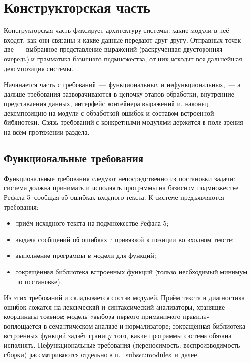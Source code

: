 \section{Конструкторская часть}
\label{sec:design}

Конструкторская часть фиксирует архитектуру системы: какие модули в неё входят, как они
связаны и какие данные передают друг другу. Отправных точек две~--- выбранное
представление выражений (раскрученная двусторонняя очередь) и грамматика базисного
подмножества; от них исходит вся дальнейшая декомпозиция системы.

Начинается часть с требований~--- функциональных и нефункциональных,~--- а дальше
требования разворачиваются в цепочку этапов обработки, внутренние представления данных,
интерфейс контейнера выражений и, наконец, декомпозицию на модули с обработкой ошибок и
составом встроенной библиотеки. Связь требований с конкретными модулями держится в поле
зрения на всём протяжении раздела.

\subsection{Функциональные требования}

Функциональные требования следуют непосредственно из постановки задачи: система должна
принимать и исполнять программы на базисном подмножестве Рефала-5, сообщая об ошибках
входного текста. К системе предъявляются требования:
\begin{itemize}
  \item приём исходного текста на подмножестве Рефала-5;
  \item выдача сообщений об ошибках с привязкой к позиции во входном тексте;
  \item выполнение программы в модели  для функций;
  \item сокращённая библиотека встроенных функций (только необходимый минимум по постановке).
\end{itemize}

Из этих требований и складывается состав модулей. Приём текста и диагностика
ошибок ложатся на лексический и синтаксический анализаторы, хранящие координаты
токенов; модель «выбора первого применимого правила» воплощается в семантическом анализе
и нормализаторе; сокращённая библиотека встроенных функций задаёт границу того, какие
программы система обязана исполнять. Нефункциональные требования (переносимость,
воспроизводимость сборки) рассматриваются отдельно в п.~\ref{subsec:modules} и далее.

